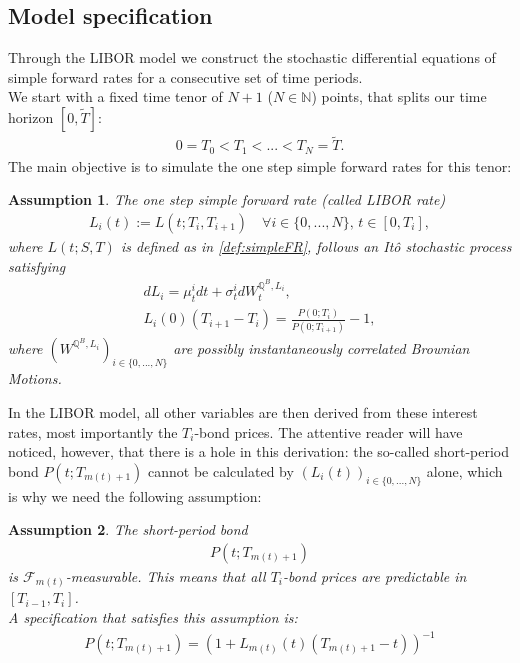 \documentclass[12pt]{article}
\newtheorem{assumption}{Assumption}[section]
\begin{document}
	\subsection{Model specification}\label{sec:libModel}
	Through the LIBOR model we construct the stochastic differential equations of simple forward rates for a consecutive set of time periods.\\
	We start with a fixed time tenor of $N+1$ ($N \in \mathbb{N}$) points, that splits our time horizon $[0,\tilde{T}]$:
	\begin{align*}
		0 = T_0 < T_1 < ... < T_N = \tilde{T}.
	\end{align*}
	The main objective is to simulate the one step simple forward rates for this tenor:
	\begin{assumption}\label{as:LIBORisItoProcess}
		The one step simple forward rate (called LIBOR rate)
		\begin{align*}
			L_i(t) := L(t;T_i, T_{i+1}) \quad \forall i \in \{0, ..., N\}\text{, } t\in[0,T_i],
		\end{align*}
		where $L(t;S, T)$ is defined as in \cref{def:simpleFR},
		follows an Itô stochastic process satisfying
		\begin{align}
			dL_i = \mu^i_t dt + \sigma^i_t dW^{\mathbb{Q}^B, L_i}_t,\label{eq:LMMSDE}\\
			L_i(0)(T_{i+1} - T_i) = \frac{P(0;T_i)}{P(0;T_{i+1})} - 1,
		\end{align}
		where $(W^{\mathbb{Q}^B, L_i})_{i\in \{0, ..., N\}}$ are possibly instantaneously correlated Brownian Motions.
	\end{assumption}
	In the LIBOR model, all other variables are then derived from these interest rates, most importantly the $T_i$-bond prices. The attentive reader will have noticed, however, that there is a hole in this derivation: the so-called short-period bond $P(t;T_{m(t)+1})$ cannot be calculated by $(L_i(t))_{i\in\{0, ..., N\}}$ alone, which is why we need the following assumption:
	\begin{assumption}\label{as:LMMShortPeriodBond}
		The short-period bond
		\begin{align*}
			P(t;T_{m(t)+1})
		\end{align*}
		is $\mathcal{F}_{m(t)}$-measurable. This means that all $T_i$-bond prices are predictable in $[T_{i-1},T_i]$.\\
		A specification that satisfies this assumption is:
		\begin{align*}
			P(t;T_{m(t)+1}) = \left(1 + L_{m(t)}(t)\left(T_{m(t)+1} - t\right)\right)^{-1}
		\end{align*}
	\end{assumption}
\end{document}
